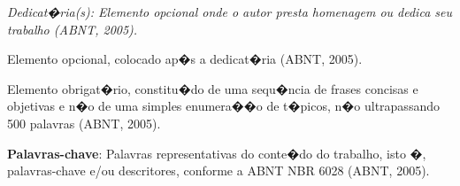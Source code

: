 \begin{flushright}
{\em 
Dedicat�ria(s): Elemento opcional onde o autor presta homenagem ou dedica seu trabalho (ABNT, 2005).
}
\end{flushright}
\newpage


\hspace{5mm}
Elemento opcional, colocado ap�s a dedicat�ria (ABNT, 2005). 

\begin{resumo}

Elemento obrigat�rio, constitu�do de uma sequ�ncia de frases concisas e objetivas e n�o de uma simples enumera��o de t�picos, n�o ultrapassando 500 palavras (ABNT, 2005).

{\hspace{-8mm} \bf{Palavras-chave}}: Palavras representativas do conte�do do trabalho, isto �, palavras-chave e/ou descritores, conforme a ABNT NBR 6028 (ABNT, 2005).

\end{resumo}

\begin{abstract}

Elemento obrigat�rio, em l�ngua estrangeira, com as mesmas caracter�sticas do resumo em l�ngua vern�cula (ABNT, 2005).

{\hspace{-8mm} \bf{Keywords}}: Palavras representativas do conte�do do trabalho, isto �, palavras-chave e/ou descritores, na l�ngua (ABNT, 2005).

\end{abstract}

\listoffigures


\cleardoublepage
\listoftables
\cleardoublepage

